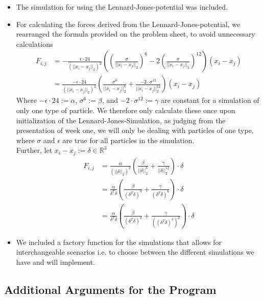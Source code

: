 \documentclass{article}
\begin{document}
\begin{itemize}
    \item The simulation for using the Lennard-Jones-potential was included.
    \item For calculating the forces derived from the Lennard-Jones-potential, we rearranged the formula provided on the problem sheet, to avoid unnecessary calculations
    \begin{align}
        F_{i,j} &= -\frac{\epsilon \cdot 24}{(||x_i-x_j||_2)^2} \left( \left( \frac{\sigma}{||x_i-x_j||_2} \right) ^6 - 2 \left( \frac{\sigma}{||x_i-x_j||_2} \right) ^{12} \right) (x_i-x_j) \\
                &= \frac{-\epsilon \cdot 24}{(||x_i-x_j||_2)^2} \left(  \frac{\sigma ^6 }{||x_i-x_j||_2 ^6 } + \frac{-2 \cdot \sigma^{12}}{||x_i-x_j||_2^{12}}  \right) (x_i-x_j)
    \end{align}
    Where  $-\epsilon \cdot 24 := \alpha$, $\sigma ^6 := \beta$, and $-2 \cdot \sigma^{12} := \gamma$ are constant for a simulation of only one type of particle. We therefore only calculate these once upon initialization of the Lennard-Jones-Simulation, as judging from the presentation of week one, we will only be dealing with particles of one type, where $\sigma$ and $\epsilon$ are true for all particles in the simulation. \\
    Further, let $x_i-x_j := \delta \in \mathbb{R}^3$
    \begin{align}
        F_{i,j} &= \frac{\alpha}{(||\delta||_2)^2} \left(  \frac{\beta}{||\delta||_2 ^6 } + \frac{\gamma}{||\delta||_2^{12}}  \right) \cdot \delta \\
        &= \frac{\alpha}{\delta ^T\delta} \left(  \frac{\beta}{(\delta ^T\delta) ^3} + \frac{\gamma}{(\delta ^T\delta) ^6}  \right) \cdot \delta \\
        &= \frac{\alpha}{\delta ^T\delta} \left(  \frac{\beta}{(\delta ^T\delta) ^3} + \frac{\gamma}{((\delta ^T\delta) ^3) ^2}  \right) \cdot \delta
    \end{align} 
    \item We included a factory function for the simulations that allows for interchangeable scenarios i.e. to choose between the different simulations we have and will implement.
\end{itemize}

\subsection{Additional Arguments for the Program}
\label{subsec:arg}
\end{document}
